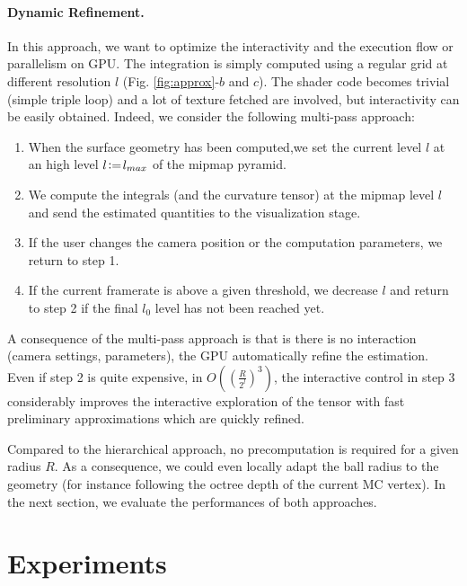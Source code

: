 \documentclass{llncs}
\begin{document}





\paragraph{Dynamic Refinement.} In this approach, we want to optimize
the interactivity and the execution flow or parallelism on GPU. The
integration is simply computed using a regular grid at different
resolution $l$ (Fig. \ref{fig:approx}-$b$ and $c$). The shader code
becomes trivial (simple triple loop) and a lot of texture fetched are
involved, but interactivity can be easily obtained. Indeed, we
consider the following multi-pass approach:
\begin{enumerate}
\item When the surface geometry has been computed,we set the current
  level $l$ at an high level $l\!\mathrel{\mathop:}=\! l_{max}$ of the mipmap
  pyramid.
\item We compute the integrals (and the curvature tensor) at the
  mipmap level $l$ and  send the estimated quantities to the
  visualization stage.
\item If the user changes the camera position or the computation
  parameters, we return to step 1.
\item If the current framerate is above a given threshold, we decrease
  $l$ and return to step 2 if the final $l_0$ level has not been
  reached yet.
\end{enumerate}
A consequence of the multi-pass approach is that is there is no
interaction (camera settings, parameters), the GPU automatically
refine the estimation. Even if step 2 is quite expensive, in
$O\left(\left(\frac{R}{2^l}\right)^3\right)$, the interactive control
 in step 3 considerably improves the interactive exploration of the
 tensor with fast preliminary approximations which are quickly refined.

 Compared to the hierarchical approach, no precomputation is required
 for a given radius $R$. As a consequence, we could even locally adapt
 the ball radius to the geometry (for instance following the octree
 depth of the current MC vertex). In the next section, we evaluate the
 performances of both approaches.


\section{Experiments}
\label{sec:experiments}
\end{document}
